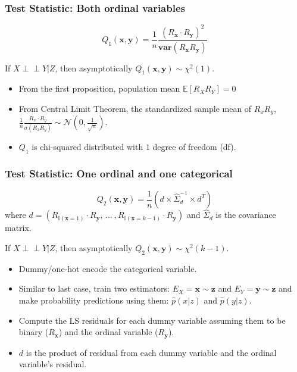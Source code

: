 \documentclass{beamer}
\def\ci{\perp\!\!\!\!\!\perp}
\begin{document}
\begin{frame}
	\frametitle{Test Statistic: Both ordinal variables}
	$$ Q_1(\bm{x}, \bm{y}) = \frac{1}{n} \frac{(R_{\bm{x}} \cdot R_{\bm{y}})^2}{\bm{var}(R_{\bm{x}} R_{\bm{y}})} $$

	If $ X \ci Y | Z $, then asymptotically $ Q_1(\bm{x}, \bm{y}) \sim \chi^2(1) $.

	\vspace{1em}
	\begin{itemize}
		\setlength\itemsep{1em}
		\item From the first proposition, population mean $ \mathbb{E}[R_X R_Y] = 0 $
		\item From Central Limit Theorem, the standardized sample mean of $ R_x R_y $, $ \frac{1}{n} \frac{R_x \cdot R_y}{\sigma(R_xR_y)} \sim \mathcal{N}(0, \frac{1}{\sqrt{n}}) $.
		\item $ Q_1 $ is chi-squared distributed with $ 1 $ degree of freedom (df).
	\end{itemize}
\end{frame}

\begin{frame}
	\frametitle{Test Statistic: One ordinal and one categorical}
	$$ Q_2(\bm{x}, \bm{y}) = \frac{1}{n} (d \times \hat{\Sigma}_d^{-1} \times d^T) $$
	where $ d = (R_{\mathbb{I}(\mathbf{x}=1)} \cdot R_{\mathbf{y}}, \, \ldots \ ,
		R_{\mathbb{I}(\mathbf{x}=k-1)} \cdot R_{\mathbf{y}})$ and $ \hat{\Sigma}_d $ is the covariance matrix.

	\vspace{1em}
	If $ X \ci Y | Z $, then asymptotically $ Q_2(\bm{x}, \bm{y}) \sim \chi^2(k-1) $.

	\begin{itemize}
		\setlength\itemsep{1em}
		\item Dummy/one-hot encode the categorical variable.
		\item Similar to last case, train two estimators: $ E_X = \mathbf{x} \sim \mathbf{z} $ and $ E_Y = \mathbf{y} \sim \mathbf{z} $ and make probability predictions using them: $ \hat{p}(x|z) $ and $ \hat{p}(y | z) $.
		\item Compute the LS residuals for each dummy variable assuming them to be binary ($ R_{\mathbf{x}} $) and the ordinal variable ($ R_{\mathbf{y}} $).
		\item $ d $ is the product of residual from each dummy variable and the ordinal variable's residual.

	\end{itemize}
\end{frame}
\end{document}

